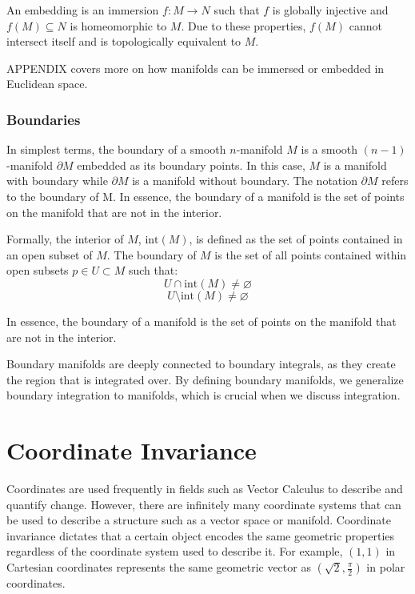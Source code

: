 \documentclass[12pt]{article}
\newcommand{\p}{\partial}
\begin{document}
An embedding is an immersion $f:M \to N$ such that $f$ is globally injective and $f(M) \subseteq N$ is homeomorphic to $M$. Due to these properties, $f(M)$ cannot intersect itself and is topologically equivalent to $M$.

APPENDIX covers more on how manifolds can be immersed or embedded in Euclidean space.

\subsubsection{Boundaries}

In simplest terms, the boundary of a smooth $n$-manifold $M$ is a smooth $(n-1)$-manifold $\p M$ embedded as its boundary points. In this case, $M$ is a manifold with boundary while $\p M$ is a manifold without boundary. The notation $\p M$ refers to the boundary of M. In essence, the boundary of a manifold is the set of points on the manifold that are not in the interior.

 Formally, the interior of $M$, $\text{int}(M)$, is defined as the set of points contained in an open subset of $M$. The boundary of $M$ is the set of all points contained within open subsets $p \in U \subset M$ such that:
 \[
U \cap \text{int}(M) \neq \varnothing
 \]
 \[
 U \setminus \text{int}(M) \neq \varnothing
 \]

In essence, the boundary of a manifold is the set of points on the manifold that are not in the interior. 

Boundary manifolds are deeply connected to boundary integrals, as they create the region that is integrated over. By defining boundary manifolds, we generalize boundary integration to manifolds, which is crucial when we discuss integration.

\section{Coordinate Invariance}

Coordinates are used frequently in fields such as Vector Calculus to describe and quantify change. However, there are infinitely many coordinate systems that can be used to describe a structure such as a vector space or manifold. Coordinate invariance dictates that a certain object encodes the same geometric properties regardless of the coordinate system used to describe it. For example, $(1, 1)$ in Cartesian coordinates represents the same geometric vector as $( \sqrt{2}, \frac{\pi}{2} )$ in polar coordinates.
\end{document}
